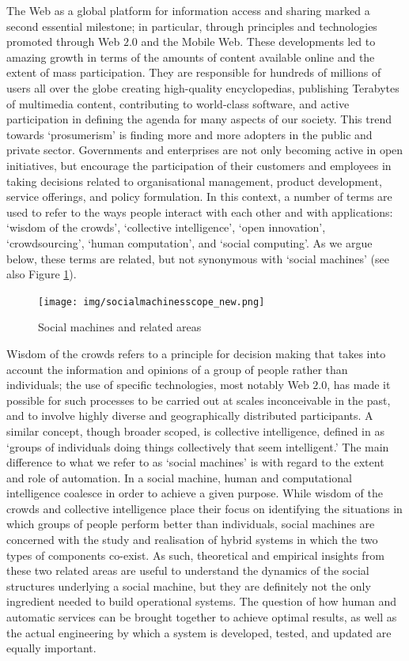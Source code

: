\documentclass{sig-alternate}
\begin{document}
The Web as a global platform for information access and sharing marked a second essential milestone; in particular, through principles and technologies promoted through Web $2.0$ and the Mobile Web. These developments led to amazing growth in terms of the amounts of content available online and the extent of mass participation. They are responsible for hundreds of millions of users all over the globe creating high-quality encyclopedias, publishing Terabytes of multimedia content, contributing to world-class software, and active participation in defining the agenda for many aspects of our society. This trend towards `prosumerism' is finding more and more adopters in the public and private sector. Governments and enterprises are not only becoming active in open initiatives, but encourage the participation of their customers and employees in taking decisions related to organisational management, product development, service offerings, and policy formulation. In this context, a number of terms are used to refer to the ways people interact with each other and with applications: `wisdom of the crowds', `collective intelligence', `open innovation', `crowdsourcing', `human computation', and `social computing'. As we argue below, these terms are related, but not synonymous with `social machines' (see also Figure \ref{fig:socialmachine}).

\begin{figure}[htb]
\begin{center}
\texttt{[image: img/socialmachinesscope\_new.png]}
\caption{Social machines and related areas} \label{fig:socialmachine}
\end{center}
\end{figure}

Wisdom of the crowds \cite{surowiecki2005wisdom} refers to a principle for decision making that takes into account the information and opinions of a group of people rather than individuals; the use of specific technologies, most notably Web $2.0$, has made it possible for such processes to be carried out at scales inconceivable in the past, and to involve highly diverse and geographically distributed participants. A similar concept, though broader scoped, is collective intelligence, defined in \cite{malone2009harnessing} as `groups of individuals doing things collectively that seem intelligent.' The main difference to what we refer to as `social machines' is with regard to the extent and role of automation. In a social machine, human and computational intelligence coalesce in order to achieve a given purpose. While wisdom of the crowds and collective intelligence place their focus on identifying the situations in which groups of people perform better than individuals, social machines are concerned with the study and realisation of hybrid systems in which the two types of components co-exist. As such, theoretical and empirical insights from these two related areas are useful to understand the dynamics of the social structures underlying a social machine, but they are definitely not the only ingredient needed to build operational systems. The question of how human and automatic services can be brought together to achieve optimal results, as well as the actual engineering by which a system is developed, tested, and updated are equally important.
\end{document}
